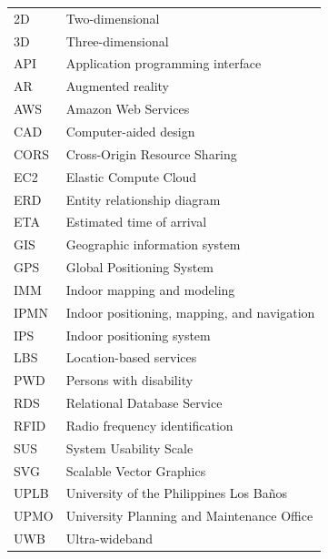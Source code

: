 
\singlespacing
\begin{longtable}{@{}p{1.3in}p{4.5in}@{}}
2D & Two-dimensional \\
3D & Three-dimensional \\
API & Application programming interface \\
AR & Augmented reality \\
AWS & Amazon Web Services \\
CAD & Computer-aided design \\
CORS & Cross-Origin Resource Sharing \\
EC2 & Elastic Compute Cloud \\
ERD & Entity relationship diagram \\
ETA & Estimated time of arrival \\
GIS & Geographic information system \\
GPS & Global Positioning System \\
IMM & Indoor mapping and modeling \\
IPMN & Indoor positioning, mapping, and navigation \\
IPS & Indoor positioning system \\
LBS & Location-based services \\
PWD & Persons with disability \\
RDS & Relational Database Service \\
RFID & Radio frequency identification \\
SUS & System Usability Scale \\
SVG & Scalable Vector Graphics \\
UPLB & University of the Philippines Los Baños \\
UPMO & University Planning and Maintenance Office \\
UWB & Ultra-wideband \\
\end{longtable}

\doublespacing
